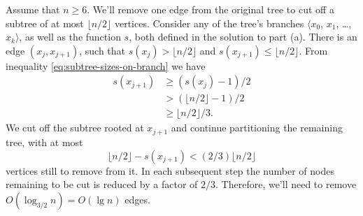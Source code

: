 \subproblem
Assume that $n\ge6$.
We'll remove one edge from the original tree to cut off a subtree of at most $\lfloor n/2\rfloor$ vertices.
Consider any of the tree's branches $\langle x_0$, $x_1$, \dots, $x_k\rangle$, as well as the function $s$, both defined in the solution to part (a).
There is an edge $(x_j,x_{j+1})$, such that $s(x_j)>\lfloor n/2\rfloor$ and $s(x_{j+1})\le\lfloor n/2\rfloor$.
From inequality \eqref{eq:subtree-sizes-on-branch} we have
\begin{align*}
    s(x_{j+1}) &\ge (s(x_j)-1)/2 \\
    &> (\lfloor n/2\rfloor-1)/2 \\
    &\ge \lfloor n/2\rfloor/3.
\end{align*}
We cut off the subtree rooted at $x_{j+1}$ and continue partitioning the remaining tree, with at most
\[
    \lfloor n/2\rfloor-s(x_{j+1}) < (2/3)\lfloor n/2\rfloor
\]
vertices still to remove from it.
In each subsequent step the number of nodes remaining to be cut is reduced by a factor of $2/3$.
Therefore, we'll need to remove $O(\log_{3/2}n)=O(\lg n)$ edges.
